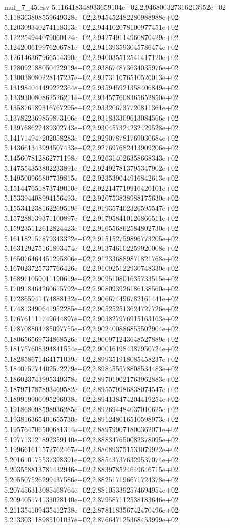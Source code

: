 \begin{filecontents*}{muf_7_45.csv}
5.116418348933659104e+02,2.946800327316213952e+02
5.118363808559649328e+02,2.945452482280988988e+02
5.120309340274118313e+02,2.944102078100977451e+02
5.122254944079060124e+02,2.942749114960870429e+02
5.124200619976206781e+02,2.941393593045786474e+02
5.126146367966514390e+02,2.940035512541417120e+02
5.128092188050422919e+02,2.938674873634035976e+02
5.130038080228147237e+02,2.937311676510526013e+02
5.131984044499222364e+02,2.935945921358406849e+02
5.133930080862526211e+02,2.934577608365652850e+02
5.135876189316767295e+02,2.933206737720811361e+02
5.137822369859873106e+02,2.931833309613084566e+02
5.139768622489302743e+02,2.930457324232429528e+02
5.141714947202058283e+02,2.929078781769030684e+02
5.143661343994507433e+02,2.927697682413909206e+02
5.145607812862771198e+02,2.926314026358668343e+02
5.147554353802233891e+02,2.924927813795347902e+02
5.149500966807739815e+02,2.923539044916842613e+02
5.151447651873749010e+02,2.922147719916420101e+02
5.153394408994156493e+02,2.920753838988175630e+02
5.155341238162269519e+02,2.919357402326595547e+02
5.157288139371100897e+02,2.917958410126866511e+02
5.159235112612824423e+02,2.916556862584802730e+02
5.161182157879343322e+02,2.915152759896773205e+02
5.163129275161893474e+02,2.913746102259920008e+02
5.165076464451295806e+02,2.912336889871821768e+02
5.167023725737766426e+02,2.910925122930748330e+02
5.168971059011190619e+02,2.909510801635733515e+02
5.170918464260615792e+02,2.908093926186138560e+02
5.172865941474888132e+02,2.906674496782161441e+02
5.174813490641952285e+02,2.905252513624727726e+02
5.176761111749644897e+02,2.903827976915163163e+02
5.178708804785097755e+02,2.902400886855502904e+02
5.180656569734868526e+02,2.900971243648527889e+02
5.181757608394841554e+02,2.900161984387950724e+02
5.182858671464171039e+02,2.899351918085458237e+02
5.184075774402572279e+02,2.898455578808534483e+02
5.186023743995349378e+02,2.897019021763962883e+02
5.187971787893469582e+02,2.895579986838074547e+02
5.189919906095296938e+02,2.894138474204419254e+02
5.191868098598936285e+02,2.892694484037010625e+02
5.193816365401655730e+02,2.891248016510598973e+02
5.195764706500681314e+02,2.889799071800362071e+02
5.197713121892359140e+02,2.888347650082378095e+02
5.199661611572762467e+02,2.886893751533079922e+02
5.201610175537398391e+02,2.885437376329537074e+02
5.203558813781432946e+02,2.883978524649646715e+02
5.205507526299437586e+02,2.882517196671724378e+02
5.207456313085468764e+02,2.881053392574694954e+02
5.209405174133028140e+02,2.879587112538183646e+02
5.211354109435412738e+02,2.878118356742470496e+02
5.213303118985101037e+02,2.876647125368453999e+02

\end{filecontents*}

